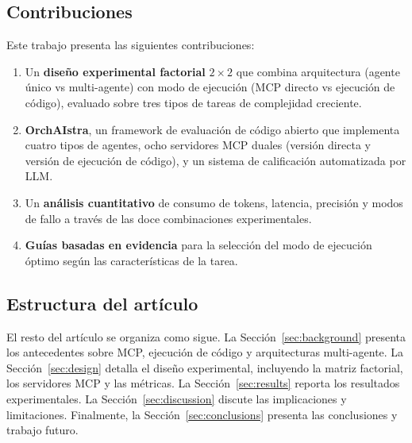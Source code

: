\documentclass[runningheads]{llncs}
\begin{document}
\subsection{Contribuciones}
\label{sec:contributions}

Este trabajo presenta las siguientes contribuciones:

\begin{enumerate}
    \item Un \textbf{dise\~no experimental factorial} $2 \times 2$ que combina
    arquitectura (agente \'unico vs multi-agente) con modo de ejecuci\'on (MCP
    directo vs ejecuci\'on de c\'odigo), evaluado sobre tres tipos de tareas de
    complejidad creciente.

    \item \textbf{OrchAIstra}, un framework de evaluaci\'on de c\'odigo abierto
    que implementa cuatro tipos de agentes, ocho servidores MCP duales
    (versi\'on directa y versi\'on de ejecuci\'on de c\'odigo), y un sistema de
    calificaci\'on automatizada por LLM.

    \item Un \textbf{an\'alisis cuantitativo} de consumo de tokens, latencia,
    precisi\'on y modos de fallo a trav\'es de las doce combinaciones
    experimentales.

    \item \textbf{Gu\'ias basadas en evidencia} para la selecci\'on del modo de
    ejecuci\'on \'optimo seg\'un las caracter\'isticas de la tarea.
\end{enumerate}

\subsection{Estructura del art\'iculo}
\label{sec:structure}

El resto del art\'iculo se organiza como sigue. La Secci\'on~\ref{sec:background}
presenta los antecedentes sobre MCP, ejecuci\'on de c\'odigo y arquitecturas
multi-agente. La Secci\'on~\ref{sec:design} detalla el dise\~no experimental,
incluyendo la matriz factorial, los servidores MCP y las m\'etricas. La
Secci\'on~\ref{sec:results} reporta los resultados experimentales. La
Secci\'on~\ref{sec:discussion} discute las implicaciones y limitaciones.
Finalmente, la Secci\'on~\ref{sec:conclusions} presenta las conclusiones y
trabajo futuro.

%
\end{document}
